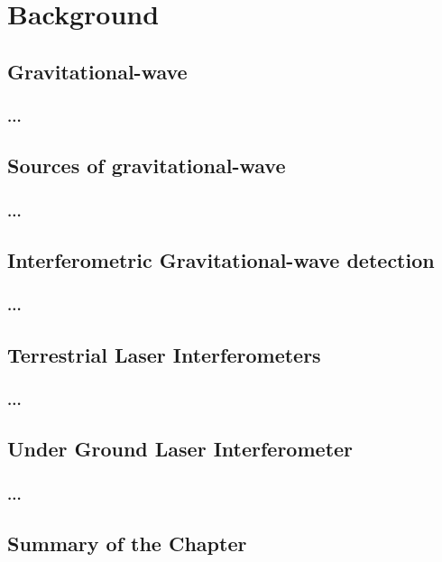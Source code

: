 \chapter{Background}
\section{Gravitational-wave}
\subsection{...}
\section{Sources of gravitational-wave}
\subsection{...}
\section{Interferometric Gravitational-wave detection}
\subsection{...}
\section{Terrestrial Laser Interferometers}
\subsection{...}
\section{Under Ground Laser Interferometer}
\subsection{...}
\section{Summary of the Chapter}
